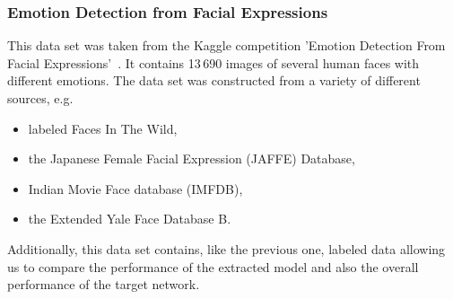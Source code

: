 \documentclass[a4paper,11pt]{article}
\begin{document}
        \subsubsection{Emotion Detection from Facial Expressions} \label{subsec:dataset_kaggle-emotions}
            This data set was taken from the Kaggle competition 'Emotion Detection From Facial Expressions'~\cite{kaggle-emotion}. 
            It contains 13\,690 images of several human faces with different emotions. The data set was constructed from a variety of different sources, e.g.
            \begin{itemize}
                \item labeled Faces In The Wild,
                \item the Japanese Female Facial Expression (JAFFE) Database,
                \item Indian Movie Face database (IMFDB),
                \item the Extended Yale Face Database B.
            \end{itemize}
            
            Additionally, this data set contains, like the previous one, labeled data allowing us to compare the performance of the extracted model and also the overall performance of the target network.
    
\end{document}
